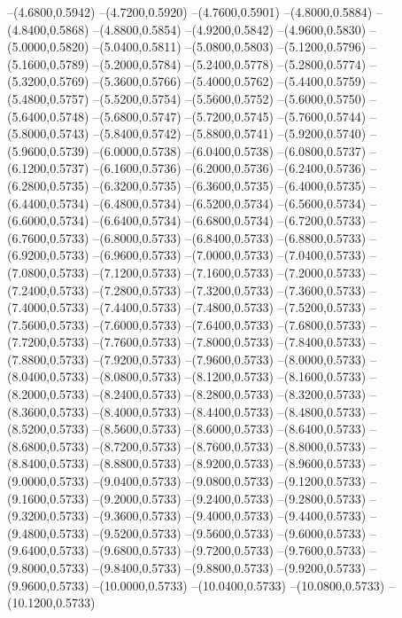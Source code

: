 {	--(4.6800,0.5942)
	--(4.7200,0.5920)
	--(4.7600,0.5901)
	--(4.8000,0.5884)
	--(4.8400,0.5868)
	--(4.8800,0.5854)
	--(4.9200,0.5842)
	--(4.9600,0.5830)
	--(5.0000,0.5820)
	--(5.0400,0.5811)
	--(5.0800,0.5803)
	--(5.1200,0.5796)
	--(5.1600,0.5789)
	--(5.2000,0.5784)
	--(5.2400,0.5778)
	--(5.2800,0.5774)
	--(5.3200,0.5769)
	--(5.3600,0.5766)
	--(5.4000,0.5762)
	--(5.4400,0.5759)
	--(5.4800,0.5757)
	--(5.5200,0.5754)
	--(5.5600,0.5752)
	--(5.6000,0.5750)
	--(5.6400,0.5748)
	--(5.6800,0.5747)
	--(5.7200,0.5745)
	--(5.7600,0.5744)
	--(5.8000,0.5743)
	--(5.8400,0.5742)
	--(5.8800,0.5741)
	--(5.9200,0.5740)
	--(5.9600,0.5739)
	--(6.0000,0.5738)
	--(6.0400,0.5738)
	--(6.0800,0.5737)
	--(6.1200,0.5737)
	--(6.1600,0.5736)
	--(6.2000,0.5736)
	--(6.2400,0.5736)
	--(6.2800,0.5735)
	--(6.3200,0.5735)
	--(6.3600,0.5735)
	--(6.4000,0.5735)
	--(6.4400,0.5734)
	--(6.4800,0.5734)
	--(6.5200,0.5734)
	--(6.5600,0.5734)
	--(6.6000,0.5734)
	--(6.6400,0.5734)
	--(6.6800,0.5734)
	--(6.7200,0.5733)
	--(6.7600,0.5733)
	--(6.8000,0.5733)
	--(6.8400,0.5733)
	--(6.8800,0.5733)
	--(6.9200,0.5733)
	--(6.9600,0.5733)
	--(7.0000,0.5733)
	--(7.0400,0.5733)
	--(7.0800,0.5733)
	--(7.1200,0.5733)
	--(7.1600,0.5733)
	--(7.2000,0.5733)
	--(7.2400,0.5733)
	--(7.2800,0.5733)
	--(7.3200,0.5733)
	--(7.3600,0.5733)
	--(7.4000,0.5733)
	--(7.4400,0.5733)
	--(7.4800,0.5733)
	--(7.5200,0.5733)
	--(7.5600,0.5733)
	--(7.6000,0.5733)
	--(7.6400,0.5733)
	--(7.6800,0.5733)
	--(7.7200,0.5733)
	--(7.7600,0.5733)
	--(7.8000,0.5733)
	--(7.8400,0.5733)
	--(7.8800,0.5733)
	--(7.9200,0.5733)
	--(7.9600,0.5733)
	--(8.0000,0.5733)
	--(8.0400,0.5733)
	--(8.0800,0.5733)
	--(8.1200,0.5733)
	--(8.1600,0.5733)
	--(8.2000,0.5733)
	--(8.2400,0.5733)
	--(8.2800,0.5733)
	--(8.3200,0.5733)
	--(8.3600,0.5733)
	--(8.4000,0.5733)
	--(8.4400,0.5733)
	--(8.4800,0.5733)
	--(8.5200,0.5733)
	--(8.5600,0.5733)
	--(8.6000,0.5733)
	--(8.6400,0.5733)
	--(8.6800,0.5733)
	--(8.7200,0.5733)
	--(8.7600,0.5733)
	--(8.8000,0.5733)
	--(8.8400,0.5733)
	--(8.8800,0.5733)
	--(8.9200,0.5733)
	--(8.9600,0.5733)
	--(9.0000,0.5733)
	--(9.0400,0.5733)
	--(9.0800,0.5733)
	--(9.1200,0.5733)
	--(9.1600,0.5733)
	--(9.2000,0.5733)
	--(9.2400,0.5733)
	--(9.2800,0.5733)
	--(9.3200,0.5733)
	--(9.3600,0.5733)
	--(9.4000,0.5733)
	--(9.4400,0.5733)
	--(9.4800,0.5733)
	--(9.5200,0.5733)
	--(9.5600,0.5733)
	--(9.6000,0.5733)
	--(9.6400,0.5733)
	--(9.6800,0.5733)
	--(9.7200,0.5733)
	--(9.7600,0.5733)
	--(9.8000,0.5733)
	--(9.8400,0.5733)
	--(9.8800,0.5733)
	--(9.9200,0.5733)
	--(9.9600,0.5733)
	--(10.0000,0.5733)
	--(10.0400,0.5733)
	--(10.0800,0.5733)
	--(10.1200,0.5733)
}
